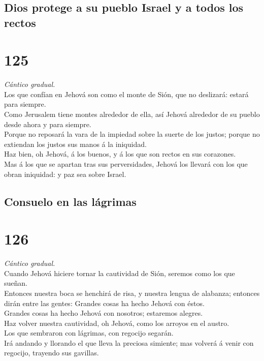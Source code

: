 \hypertarget{dios-protege-a-su-pueblo-israel-y-a-todos-los-rectos}{%
\subsection{Dios protege a su pueblo Israel y a todos los
rectos}\label{dios-protege-a-su-pueblo-israel-y-a-todos-los-rectos}}

\hypertarget{section-124}{%
\section{125}\label{section-124}}

 \emph{Cántico gradual.}\\
Los que confían en Jehová son como el monte de Sión, que no deslizará:
estará para siempre.\\
 Como Jerusalem tiene montes alrededor de ella, así Jehová
alrededor de su pueblo desde ahora y para siempre.\\
 Porque no reposará la vara de la impiedad sobre la suerte
de los justos; porque no extiendan los justos sus manos á la
iniquidad.\\
 Haz bien, oh Jehová, á los buenos, y á los que son rectos
en sus corazones.\\
 Mas á los que se apartan tras sus perversidades, Jehová los
llevará con los que obran iniquidad: y paz sea sobre Israel.

\hypertarget{consuelo-en-las-luxe1grimas}{%
\subsection{Consuelo en las
lágrimas}\label{consuelo-en-las-luxe1grimas}}

\hypertarget{section-125}{%
\section{126}\label{section-125}}

 \emph{Cántico gradual.}\\
Cuando Jehová hiciere tornar la cautividad de Sión, seremos como los que
sueñan.\\
 Entonces nuestra boca se henchirá de risa, y nuestra lengua
de alabanza; entonces dirán entre las gentes: Grandes cosas ha hecho
Jehová con éstos.\\
 Grandes cosas ha hecho Jehová con nosotros; estaremos
alegres.\\
 Haz volver nuestra cautividad, oh Jehová, como los arroyos
en el austro.\\
 Los que sembraron con lágrimas, con regocijo segarán.\\
 Irá andando y llorando el que lleva la preciosa simiente;
mas volverá á venir con regocijo, trayendo sus gavillas.

